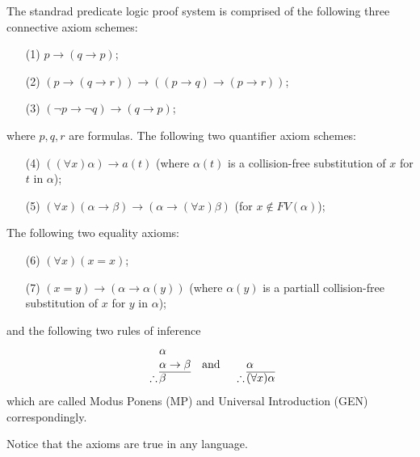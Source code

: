 \documentclass[11pt,a4paper]{article}
\renewcommand{\implies}{\rightarrow}
\begin{document}
  \begin{definition}
    The standrad predicate logic proof system is comprised of the
    following three connective axiom schemes:
    \begin{enumerate}
      \item[(1)] $p\to (q\to p)$;
      \item[(2)] $(p\to (q\to r))\to ((p\to q)\to (p\to r))$;
      \item[(3)] $(\neg p\to \neg q)\to (q\to p)$;
    \end{enumerate}
    where $p,q,r$ are formulas.
    The following two quantifier axiom schemes:
    \begin{enumerate}
      \item[(4)] $((\forall x) \alpha) \implies a(t)$ (where $\alpha(t)$
        is a collision-free substitution of $x$ for $t$ in $\alpha$);
      \item[(5)] $(\forall x)(\alpha \implies \beta) \implies
        (\alpha \implies (\forall x)\beta)$ (for $x \notin FV(\alpha)$);
    \end{enumerate}
    The following two equality axioms:
    \begin{enumerate}
      \item[(6)] $(\forall x)(x = x)$;
      \item[(7)] $(x = y) \implies (\alpha \implies \alpha(y))$ (where
        $\alpha(y)$ is a partiall collision-free substitution of $x$
        for $y$ in $\alpha$);
    \end{enumerate}
    and the following two rules of inference
    \[
      \begin{array}{c@{\,}l@{}}
                  & \alpha         \\
                  & \alpha \to \beta   \\ \cline{2-2}
      \therefore  & \beta
      \end{array} \tand
      \begin{array}{c@{\,}l@{}}
                  & \\
                  & \alpha         \\ \cline{2-2}
      \therefore  & (\forall x)\alpha
      \end{array}
    \]
    which are called Modus Ponens (MP) and Universal Introduction (GEN)
    correspondingly.
  \end{definition}

  \begin{remark}
    Notice that the axioms are true in any language.
  \end{remark}
\end{document}
